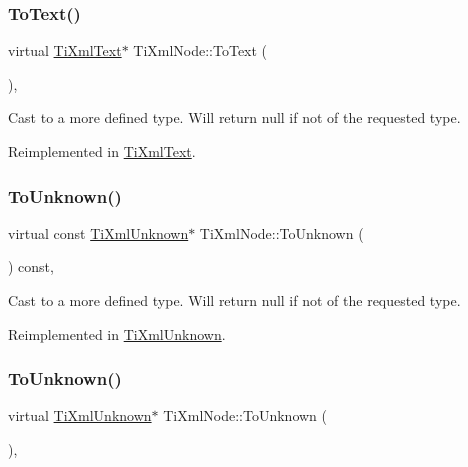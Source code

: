 \subsubsection{\texorpdfstring{To\+Text()}{ToText()}\hspace{0.1cm}{\footnotesize\ttfamily [2/2]}}
{\footnotesize\ttfamily virtual \hyperlink{class_ti_xml_text}{Ti\+Xml\+Text}$\ast$ Ti\+Xml\+Node\+::\+To\+Text (\begin{DoxyParamCaption}{ }\end{DoxyParamCaption})\hspace{0.3cm}{\ttfamily [inline]}, {\ttfamily [virtual]}}



Cast to a more defined type. Will return null if not of the requested type. 



Reimplemented in \hyperlink{class_ti_xml_text_ae7c3a8fd3e4dbf6c0c4363a943d72f5b}{Ti\+Xml\+Text}.

\mbox{\label{class_ti_xml_node_ab4f2e6ce87d36c1b9b7de2529128a460}} 
\subsubsection{\texorpdfstring{To\+Unknown()}{ToUnknown()}\hspace{0.1cm}{\footnotesize\ttfamily [1/2]}}
{\footnotesize\ttfamily virtual const \hyperlink{class_ti_xml_unknown}{Ti\+Xml\+Unknown}$\ast$ Ti\+Xml\+Node\+::\+To\+Unknown (\begin{DoxyParamCaption}{ }\end{DoxyParamCaption}) const\hspace{0.3cm}{\ttfamily [inline]}, {\ttfamily [virtual]}}



Cast to a more defined type. Will return null if not of the requested type. 



Reimplemented in \hyperlink{class_ti_xml_unknown_a0d08dc16fc9ce16140ccaefbc35f6ea6}{Ti\+Xml\+Unknown}.

\mbox{\label{class_ti_xml_node_a06de5af852668c7e4af0d09c205f0b0d}} 
\subsubsection{\texorpdfstring{To\+Unknown()}{ToUnknown()}\hspace{0.1cm}{\footnotesize\ttfamily [2/2]}}
{\footnotesize\ttfamily virtual \hyperlink{class_ti_xml_unknown}{Ti\+Xml\+Unknown}$\ast$ Ti\+Xml\+Node\+::\+To\+Unknown (\begin{DoxyParamCaption}{ }\end{DoxyParamCaption})\hspace{0.3cm}{\ttfamily [inline]}, {\ttfamily [virtual]}}



